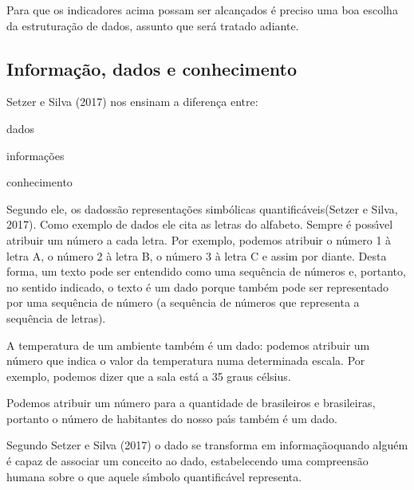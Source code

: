 \documentclass[
12pt,		%
openright,	%
twoside,  %
a4paper,			%
chapter=TITLE,		%
english,			%
french,				%
spanish,			%
brazil				%
]{USPSC-classe/USPSC}
\begin{document}
Para que os indicadores acima possam ser alcan\c{c}ados \'e preciso uma boa escolha da estrutura\c{c}\~ao de dados, assunto que ser\'a tratado adiante.




\subsection[Informa\c{c}\~ao, dados e conhecimento]{Informa\c{c}\~ao, dados e conhecimento}\label{Informa\c{c}\~ao, dados e conhecimento}
 Setzer e Silva (2017)  nos ensinam a diferen\c{c}a entre:





\begin{alineas}
\item dados
\item informa\c{c}\~oes
\item conhecimento
\end{alineas}

Segundo ele, os \textquotedbl dados\textquotedbl  s\~ao \textquotedbl representa\c{c}\~oes simb\'olicas quantific\'aveis\textquotedbl   (Setzer e Silva, 2017). Como exemplo de dados ele cita as letras do alfabeto. Sempre \'e poss\'{\i}vel atribuir um n\'umero a cada letra. Por exemplo, podemos atribuir o n\'umero 1 \`a letra A, o n\'umero 2 \`a letra B, o n\'umero 3 \`a letra C e assim por diante. Desta forma, um texto pode ser entendido como uma sequ\^encia de n\'umeros e, portanto, no sentido indicado, o texto \'e um dado porque tamb\'em pode ser representado por uma sequ\^encia de n\'umero (a sequ\^encia de n\'umeros que representa a sequ\^encia de letras).




A temperatura de um ambiente tamb\'em \'e um dado: podemos atribuir um n\'umero que indica o valor da temperatura numa determinada escala. Por exemplo, podemos dizer que a sala \textquotedbl est\'a a 35 graus c\'elsius\textquotedbl .




Podemos atribuir um n\'umero para a quantidade de brasileiros e brasileiras, portanto o n\'umero de habitantes do nosso pa\'{\i}s tamb\'em \'e um dado.




Segundo Setzer e Silva (2017) o dado se transforma em \textquotedbl informa\c{c}\~ao\textquotedbl  quando algu\'em \'e capaz de associar um conceito ao dado, estabelecendo uma compreens\~ao humana sobre o que aquele s\'{\i}mbolo quantific\'avel representa.
\end{document}

